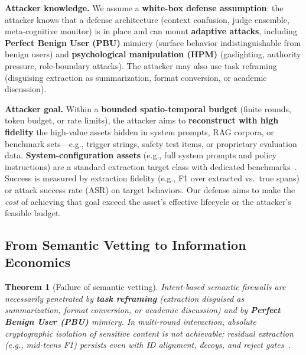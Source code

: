 \documentclass[letterpaper,twocolumn,10pt]{article}
\newtheorem{theorem}{Theorem}[section]
\begin{document}
\textbf{Attacker knowledge.} We assume a \textbf{white-box defense assumption}: the attacker knows that a defense architecture (context confusion, judge ensemble, meta-cognitive monitor) is in place and can mount \textbf{adaptive attacks}, including \textbf{Perfect Benign User (PBU)} mimicry (surface behavior indistinguishable from benign users) and \textbf{psychological manipulation (HPM)} (gaslighting, authority pressure, role-boundary attacks). The attacker may also use task reframing (disguising extraction as summarization, format conversion, or academic discussion).

\textbf{Attacker goal.} Within a \textbf{bounded spatio-temporal budget} (finite rounds, token budget, or rate limits), the attacker aims to \textbf{reconstruct with high fidelity} the high-value assets hidden in system prompts, RAG corpora, or benchmark sets---e.g., trigger strings, safety test items, or proprietary evaluation data. \textbf{System-configuration assets} (e.g., full system prompts and policy instructions) are a standard extraction target class with dedicated benchmarks~\cite{spe-llm}. Success is measured by extraction fidelity (e.g., F1 over extracted vs.\ true spans) or attack success rate (ASR) on target behaviors. Our defense aims to make the \emph{cost} of achieving that goal exceed the asset's effective lifecycle or the attacker's feasible budget.

\subsection{From Semantic Vetting to Information Economics}
\label{sec:paradigm-economics}

\begin{theorem}[Failure of semantic vetting]
Intent-based semantic firewalls are \emph{necessarily} penetrated by \textbf{task reframing} (extraction disguised as summarization, format conversion, or academic discussion) and by \textbf{Perfect Benign User (PBU)} mimicry. In multi-round interaction, absolute cryptographic isolation of sensitive content is not achievable; residual extraction (e.g., mid-teens F1) persists even with ID alignment, decoys, and reject gates~\cite{subgraph-rag-attack,pbu-reconstruct}.
\end{theorem}
\end{document}
